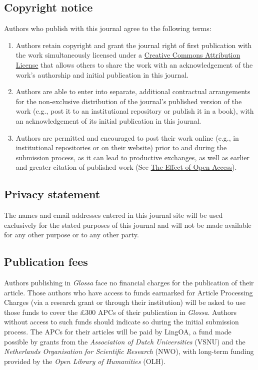\documentclass[charis,linguex,biblatex]{glossa}
\begin{document}
\subsection{Copyright notice}

Authors who publish with this journal agree to the following terms:

\begin{enumerate}[label=\arabic*.]
\item Authors retain copyright and grant the journal right of first publication with the work simultaneously licensed under a \href{http://creativecommons.org/licenses/by/3.0/}{Creative Commons Attribution License} that allows others to share the work with an acknowledgement of the work's authorship and initial publication in this journal.
\item Authors are able to enter into separate, additional contractual arrangements for the non-exclusive distribution of the journal's published version of the work (e.g., post it to an institutional repository or publish it in a book), with an acknowledgement of its initial publication in this journal.
\item Authors are permitted and encouraged to post their work online (e.g., in institutional repositories or on their website) prior to and during the submission process, as it can lead to productive exchanges, as well as earlier and greater citation of published work (See \href{http://opcit.eprints.org/oacitation-biblio.html}{The Effect of Open Access}).
\end{enumerate}

\subsection{Privacy statement}

The names and email addresses entered in this journal site will be used exclusively for the stated purposes of this journal and will not be made available for any other purpose or to any other party.

\subsection{Publication fees}

Authors publishing in \textit{Glossa} face no financial charges for the publication of their article. Those authors who have access to funds earmarked for Article Processing Charges  (via a research grant or through their institution) will be asked to use those funds to cover the £300 APCs of their publication in \textit{Glossa}. Authors without access to such funds should indicate so during the initial submission process. The APCs for their articles will be paid by LingOA, a fund made possible by grants from the \textit{Association of Dutch Universities} (VSNU) and the \textit{Netherlands Organisation for Scientific Research} (NWO), with long-term funding provided by the \textit{Open Library of Humanities} (OLH).
\end{document}
